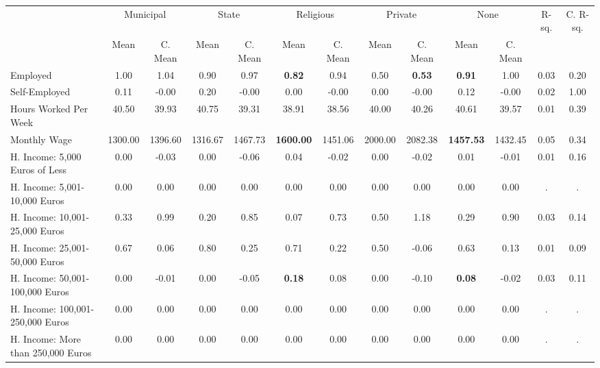 \begin{tabular}{l c c c c c c c c c c c c}
\toprule
& \multicolumn{2}{c}{Municipal} & \multicolumn{2}{c}{State} & \multicolumn{2}{c}{Religious} & \multicolumn{2}{c}{Private} & \multicolumn{2}{c}{None} & R-sq. & C. R-sq. \\
& \scriptsize Mean & \scriptsize C. Mean & \scriptsize Mean & \scriptsize C. Mean & \scriptsize Mean & \scriptsize C. Mean & \scriptsize Mean & \scriptsize C. Mean & \scriptsize Mean & \scriptsize C. Mean & & \\
\midrule
Employed &      1.00 & 1.04 &      0.90 & 0.97 & \textbf{     0.82} & 0.94 &      0.50 & \textbf{     0.53} & \textbf{     0.91} & 1.00 &      0.03 &      0.20 \\
Self-Employed &      0.11 & -0.00 &      0.20 & -0.00 &      0.00 & -0.00 &      0.00 & -0.00 &      0.12 & -0.00 &      0.02 &      1.00 \\
Hours Worked Per Week &     40.50 & 39.93 &     40.75 & 39.31 &     38.91 & 38.56 &     40.00 & 40.26 &     40.61 & 39.57 &      0.01 &      0.39 \\
Monthly Wage &   1300.00 & 1396.60 &   1316.67 & 1467.73 & \textbf{  1600.00} & 1451.06 &   2000.00 & 2082.38 & \textbf{  1457.53} & 1432.45 &      0.05 &      0.34 \\
H. Income: 5,000 Euros of Less &      0.00 & -0.03 &      0.00 & -0.06 &      0.04 & -0.02 &      0.00 & -0.02 &      0.01 & -0.01 &      0.01 &      0.16 \\
H. Income: 5,001-10,000 Euros &      0.00 & 0.00 &      0.00 & 0.00 &      0.00 & 0.00 &      0.00 & 0.00 &      0.00 & 0.00 &         . &         . \\
H. Income: 10,001-25,000 Euros &      0.33 & 0.99 &      0.20 & 0.85 &      0.07 & 0.73 &      0.50 & 1.18 &      0.29 & 0.90 &      0.03 &      0.14 \\
H. Income: 25,001-50,000 Euros &      0.67 & 0.06 &      0.80 & 0.25 &      0.71 & 0.22 &      0.50 & -0.06 &      0.63 & 0.13 &      0.01 &      0.09 \\
H. Income: 50,001-100,000 Euros &      0.00 & -0.01 &      0.00 & -0.05 & \textbf{     0.18} & 0.08 &      0.00 & -0.10 & \textbf{     0.08} & -0.02 &      0.03 &      0.11 \\
H. Income: 100,001-250,000 Euros &      0.00 & 0.00 &      0.00 & 0.00 &      0.00 & 0.00 &      0.00 & 0.00 &      0.00 & 0.00 &         . &         . \\
H. Income: More than 250,000 Euros &      0.00 & 0.00 &      0.00 & 0.00 &      0.00 & 0.00 &      0.00 & 0.00 &      0.00 & 0.00 &         . &         . \\
\bottomrule
\end{tabular}
